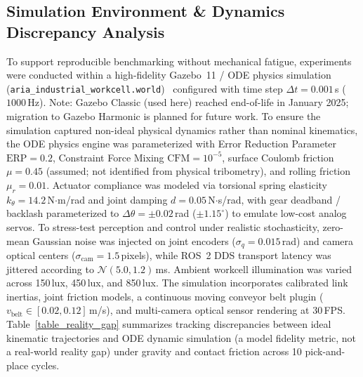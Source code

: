 \documentclass[journal]{IEEEtran}
\begin{document}
\subsection{Simulation Environment \& Dynamics Discrepancy Analysis}
To support reproducible benchmarking without mechanical fatigue, experiments were conducted within a high-fidelity Gazebo~11 / ODE physics simulation (\texttt{aria\_industrial\_workcell.world})~\cite{gazebo_2004,aria_117_vieira_2025_application} configured with time step $\Delta t = 0.001$\,s ($1000$\,Hz). Note: Gazebo Classic (used here) reached end-of-life in January 2025; migration to Gazebo Harmonic is planned for future work. To ensure the simulation captured non-ideal physical dynamics rather than nominal kinematics, the ODE physics engine was parameterized with Error Reduction Parameter $\text{ERP} = 0.2$, Constraint Force Mixing $\text{CFM} = 10^{-5}$, surface Coulomb friction $\mu = 0.45$ (assumed; not identified from physical tribometry), and rolling friction $\mu_r = 0.01$. Actuator compliance was modeled via torsional spring elasticity $k_\theta = 14.2$\,N$\cdot$m/rad and joint damping $d = 0.05$\,N$\cdot$s/rad, with gear deadband / backlash parameterized to $\Delta\theta = \pm 0.02$\,rad ($\pm 1.15^\circ$) to emulate low-cost analog servos. To stress-test perception and control under realistic stochasticity, zero-mean Gaussian noise was injected on joint encoders ($\sigma_q = 0.015$\,rad) and camera optical centers ($\sigma_{\text{cam}} = 1.5$\,pixels), while ROS~2 DDS transport latency was jittered according to $\mathcal{N}(5.0, 1.2)$\,ms. Ambient workcell illumination was varied across 150\,lux, 450\,lux, and 850\,lux. The simulation incorporates calibrated link inertias, joint friction models, a continuous moving conveyor belt plugin ($v_{\text{belt}} \in [0.02, 0.12]$\,m/s), and multi-camera optical sensor rendering at 30\,FPS. Table~\ref{table_reality_gap} summarizes tracking discrepancies between ideal kinematic trajectories and ODE dynamic simulation (a model fidelity metric, not a real-world reality gap) under gravity and contact friction across 10 pick-and-place cycles.

\begin{table}[!t]
\centering
\caption{Tracking Discrepancy: Ideal Kinematic Reference vs. ODE Dynamic Simulation ($n=10$ Pick-and-Place Cycles)}
\label{table_reality_gap}
\footnotesize
{}
\end{table}
\end{document}
